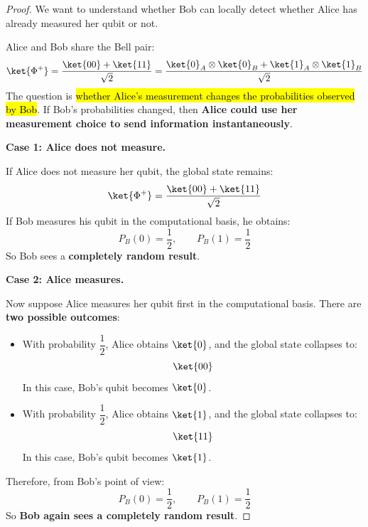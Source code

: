 \begin{proof}
    We want to understand whether Bob can locally detect whether Alice has already measured her qubit or not.

    \highspace
    Alice and Bob share the Bell pair:
    \begin{equation*}
        \ket{\Phi^+}
        =
        \frac{\ket{00}+\ket{11}}{\sqrt{2}}
        =
        \frac{\ket{0}_A \otimes \ket{0}_B+\ket{1}_A \otimes \ket{1}_B}{\sqrt{2}}
    \end{equation*}
    The question is \hl{whether Alice's measurement changes the probabilities observed by Bob}. If Bob's probabilities changed, then \textbf{Alice could use her measurement choice to send information instantaneously}.

    \highspace
    \textbf{Case 1: Alice does not measure.}

    \noindent
    If Alice does not measure her qubit, the global state remains:
    \begin{equation*}
        \ket{\Phi^+}
        =
        \frac{\ket{00}+\ket{11}}{\sqrt{2}}
    \end{equation*}
    If Bob measures his qubit in the computational basis, he obtains:
    \begin{equation*}
        P_B(0)=\frac{1}{2},
        \qquad
        P_B(1)=\frac{1}{2}
    \end{equation*}
    So Bob sees a \textbf{completely random result}.

    \highspace
    \textbf{Case 2: Alice measures.}

    \noindent
    Now suppose Alice measures her qubit first in the computational basis. There are \textbf{two possible outcomes}:
    \begin{itemize}
        \item With probability $\dfrac{1}{2}$, Alice obtains $\ket{0}$, and the global state collapses to:
        \begin{equation*}
            \ket{00}
        \end{equation*}
        In this case, Bob's qubit becomes $\ket{0}$.

        \item With probability $\dfrac{1}{2}$, Alice obtains $\ket{1}$, and the global state collapses to:
        \begin{equation*}
            \ket{11}
        \end{equation*}
        In this case, Bob's qubit becomes $\ket{1}$.
    \end{itemize}
    Therefore, from Bob's point of view:
    \begin{equation*}
        P_B(0)=\frac{1}{2},
        \qquad
        P_B(1)=\frac{1}{2}
    \end{equation*}
    So \textbf{Bob again sees a completely random result}.


\end{proof}

